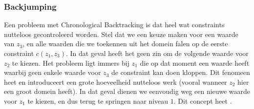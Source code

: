 \subsubsection{Backjumping}
Een probleem met Chronological Backtracking is dat heel wat constraints nutteloos gecontroleerd worden. Stel dat we een keuze maken voor een waarde van $z_3$, en alle waarden die we toekennen uit het domein falen op de eerste constraint $c\left(z_1,z_3\right)$. In dat geval heeft het geen zin om de volgende waarde voor $z_2$ te kiezen. Het probleem ligt immers bij $z_1$ die op dat moment een waarde heeft waarbij geen enkele waarde voor $z_3$ de constraint kan doen kloppen. Dit fenomeen heet  en introduceert een grote hoeveelheid nutteloos werk (vooral wanneer $z_2$ hier een groot domein heeft). In dat geval dienen we eenvoudig weg een nieuwe waarde voor $z_1$ te kiezen, en dus terug te springen naar niveau $1$. Dit concept heet .
